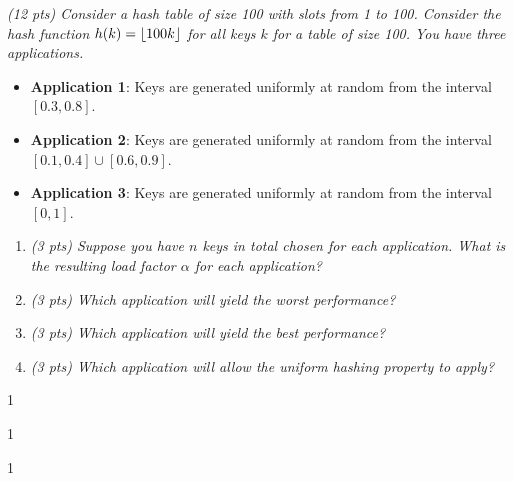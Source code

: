 \documentclass[9pt]{article}
\def\solutions{1}
\DeclarePairedDelimiter\floor{\lfloor}{\rfloor}
\begin{document}
\item { \itshape 
	    (12 pts) Consider a hash table of size 100 with slots from 1 to 100. Consider the hash function $h(k) = \floor*{100k}$ for all keys $k$ for a table of size 100. You have three applications.
	    \begin{itemize}
	        \item \textbf{Application 1}: Keys are  generated uniformly at random from the interval $[0.3, 0.8]$.
	        \item \textbf{Application 2}: Keys are  generated uniformly at random from the interval $[0.1, 0.4] \cup [0.6, 0.9]$.
	        \item \textbf{Application 3}: Keys are  generated uniformly at random from the interval $[0, 1]$.
	    \end{itemize}
	}
		\begin{enumerate}
		\item {\itshape (3 pts) Suppose you have $n$ keys in total chosen for each application. What is the resulting load factor $\alpha$ for each application? }
		
		\item {\itshape (3 pts) Which application will yield the worst performance? }
		
		\item {\itshape (3 pts) Which application will yield the best performance? }
		
		\item {\itshape (3 pts) Which application will allow the uniform hashing property to apply? }
		
    \end{enumerate}
\if\solutions1
\vspace{2mm}




\if\solutions1
\vspace{2mm}




\if\solutions1
\vspace{2mm}
\end{document}
